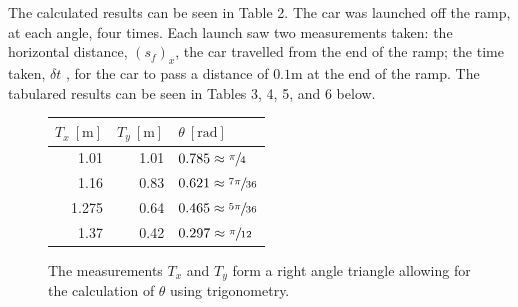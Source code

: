 \documentclass[a4paper]{article}
\begin{document}
The calculated results can be seen in Table 2. The car was launched off the ramp, at each angle, four times. Each launch saw two measurements taken: the horizontal distance, $(s_f)_x$, the car travelled from the end of the ramp; the time taken, $\delta t$ ,  for the car to pass a distance of $0.1\si{\meter}$ at the end of the ramp. The tabulared results can be seen in Tables 3, 4, 5, and 6 below.

\begin{figure}[h]
	\begin{minipage}{0.45\textwidth}
		\centering
		\caption{The measurements $T_x$ and $T_y$ form a right angle triangle allowing for the calculation of $\theta$ using trigonometry.}
	\end{minipage}
	\hspace{1cm}
	\begin{minipage}{0.45\textwidth}
		\centering
		\begin{tabular}{rrl}
			\toprule
			$T_x \ [\si{\meter}]$ & $T_y \ [\si{\meter}]$ & $\theta \ [\si{\radian}]$\\
			\midrule
			1.01 & 1.01 & $0.785 \approx \sfrac{\pi}{4}$\\
			1.16 & 0.83 & $0.621 \approx \sfrac{7\pi}{36}$\\
			1.275 & 0.64 & $0.465 \approx \sfrac{5\pi}{36}$\\
			1.37 & 0.42 & $0.297 \approx \sfrac{\pi}{12}$\\
			\bottomrule
		\end{tabular}
	\end{minipage}
\end{figure}
\end{document}
